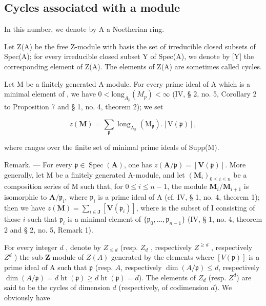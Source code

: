 \subsection{Cycles associated with a module}

In this number, we denote by A a Noetherian ring.

{}{}Let Z(A) be the free Z-module with basis the set of irreducible closed subsets of Spec(A); for every irreducible closed subset Y of Spec(A), we denote by [Y] the corresponding element of Z(A). The elements of Z(A) are sometimes called cycles.

Let M be a finitely generated A-module. For every prime ideal  of A which is a minimal element of , we have \(0 < \text{long}_{A_{p}}(M_{p}) < \infty\) (IV, § 2, no. 5, Corollary 2 to Proposition 7 and § 1, no. 4, theorem 2); we set

\[
z (\mathbf {M}) = \sum_ {\mathfrak {p}} \operatorname{long} _ {\mathrm{A} _ {\mathfrak {p}}} (\mathrm{M} _ {\mathfrak {p}}). [ \mathrm{V} (\mathfrak {p}) ],
\]

where  ranges over the finite set of minimal prime ideals of Supp(M).

Remark. --- For every \(\mathfrak{p} \in \operatorname{Spec}(\mathbf{A})\), one has \(z(\mathbf{A}/\mathfrak{p}) = [\mathbf{V}(\mathfrak{p})]\). More generally, let M be a finitely generated A-module, and let \((\mathbf{M}_i)_{0 \leqslant i \leqslant n}\) be a composition series of M such that, for \(0 \leqslant i \leqslant n - 1\), the module \(\mathbf{M}_i / \mathbf{M}_{i+1}\) is isomorphic to \(\mathbf{A}/\mathfrak{p}_i\), where \(\mathfrak{p}_i\) is a prime ideal of A (cf. IV, § 1, no. 4, theorem 1); then we have \(z(\mathbf{M}) = \sum_{i \in \mathbf{J}} [\mathbf{V}(\mathfrak{p}_i)]\), where  is the subset of I consisting of those \(i\) such that \(\mathfrak{p}_i\) is a minimal element of \(\{\mathfrak{p}_0, \ldots, \mathfrak{p}_{n-1}\}\) (IV, § 1, no. 4, theorem 2 and § 2, no. 5, Remark 1).

For every integer \(d\) , denote by \(Z_{\leq d}\) (resp. \(Z_d\) , respectively \(Z^{\geq d}\) , respectively \(Z^d\) ) the sub-\(\mathbf{Z}\)-module of \(Z(A)\) generated by the elements  where \([V(\mathfrak{p})]\) is a prime ideal of A such that \(\mathfrak{p}\) (resp. \(A\), respectively \(\dim(A/\mathfrak{p}) \leqslant d\), respectively \(\dim(A/\mathfrak{p}) = d\)\(\operatorname{ht}(\mathfrak{p}) \geqslant d\)\(\operatorname{ht}(\mathfrak{p}) = d\)). The elements of \(Z_{d}\) (resp. \(Z^{d}\)) are said to be the cycles of dimension \(d\) (respectively, of codimension \(d\)). We obviously have

